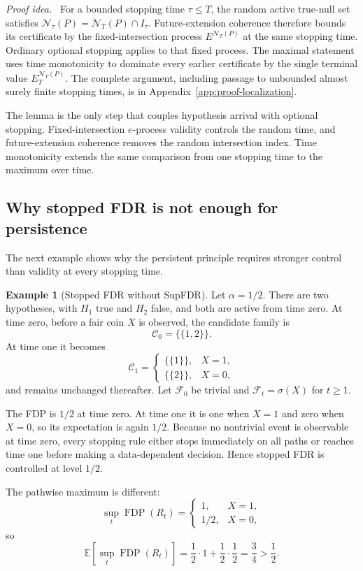 \documentclass[11pt]{article}
\numberwithin{equation}{section}
\theoremstyle{plain}
\theoremstyle{definition}
\newtheorem{example}[theorem]{Example}
\newcommand{\E}{\mathbb E}
\newcommand{\F}{\mathcal F}
\newcommand{\C}{\mathcal C}
\newcommand{\FDP}{\operatorname{FDP}}
\newcommand{\calN}{\mathcal N}
\newcommand{\proofidea}{\par\medskip\noindent\textit{Proof idea.}\ }
\begin{document}
\proofidea
For a bounded stopping time $\tau\leq T$, the random active true-null set satisfies $\calN_\tau(P)=\calN_T(P)\cap I_\tau$. Future-extension coherence therefore bounds its certificate by the fixed-intersection process $E^{\calN_T(P)}$ at the same stopping time. Ordinary optional stopping applies to that fixed process. The maximal statement uses time monotonicity to dominate every earlier certificate by the single terminal value $E_T^{\calN_T(P)}$. The complete argument, including passage to unbounded almost surely finite stopping times, is in Appendix~\ref{app:proof-localization}.

The lemma is the only step that couples hypothesis arrival with optional stopping. Fixed-intersection $e$-process validity controls the random time, and future-extension coherence removes the random intersection index. Time monotonicity extends the same comparison from one stopping time to the maximum over time.

\subsection{Why stopped FDR is not enough for persistence}\label{sec:separation}

The next example shows why the persistent principle requires stronger control than validity at every stopping time.

\begin{example}[Stopped FDR without SupFDR]\label{ex:stopped-not-sup}
Let $\alpha=1/2$. There are two hypotheses, with $H_1$ true and $H_2$ false, and both are active from time zero. At time zero, before a fair coin $X$ is observed, the candidate family is
\[
  \C_0=\bigl\{\{1,2\}\bigr\}.
\]
At time one it becomes
\[
  \C_1=
  \begin{cases}
    \bigl\{\{1\}\bigr\},&X=1,\\
    \bigl\{\{2\}\bigr\},&X=0,
  \end{cases}
\]
and remains unchanged thereafter. Let $\F_0$ be trivial and $\F_t=\sigma(X)$ for $t\geq1$.

The FDP is $1/2$ at time zero. At time one it is one when $X=1$ and zero when $X=0$, so its expectation is again $1/2$. Because no nontrivial event is observable at time zero, every stopping rule either stops immediately on all paths or reaches time one before making a data-dependent decision. Hence stopped FDR is controlled at level $1/2$.

The pathwise maximum is different:
\[
  \sup_t\FDP(R_t)=
  \begin{cases}
    1,&X=1,\\
    1/2,&X=0,
  \end{cases}
\]
so
\begin{equation}\label{eq:separation}
  \E\!\left[\sup_t\FDP(R_t)\right]
  =\frac12\cdot1+\frac12\cdot\frac12
  =\frac34>\frac12.
\end{equation}
\end{example}
\end{document}
